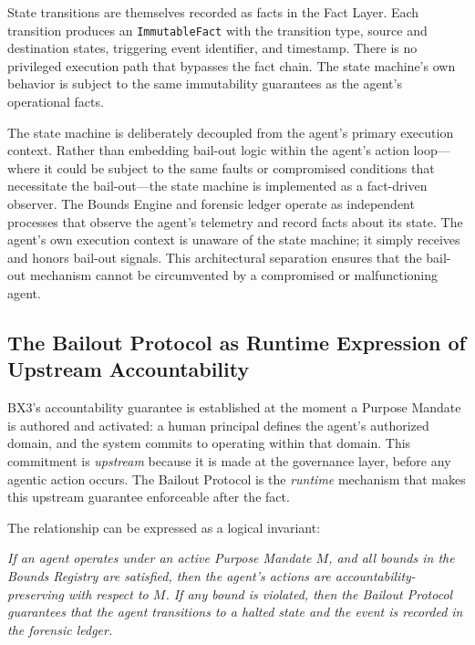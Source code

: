 State transitions are themselves recorded as facts in the Fact Layer. Each transition produces an \texttt{ImmutableFact} with the transition type, source and destination states, triggering event identifier, and timestamp. There is no privileged execution path that bypasses the fact chain. The state machine's own behavior is subject to the same immutability guarantees as the agent's operational facts.

The state machine is deliberately decoupled from the agent's primary execution context. Rather than embedding bail-out logic within the agent's action loop—where it could be subject to the same faults or compromised conditions that necessitate the bail-out—the state machine is implemented as a fact-driven observer. The Bounds Engine and forensic ledger operate as independent processes that observe the agent's telemetry and record facts about its state. The agent's own execution context is unaware of the state machine; it simply receives and honors bail-out signals. This architectural separation ensures that the bail-out mechanism cannot be circumvented by a compromised or malfunctioning agent.

\subsection{The Bailout Protocol as Runtime Expression of Upstream Accountability}
\label{subsection:bailout-upstream-accountability}

BX3's accountability guarantee is established at the moment a Purpose Mandate is authored and activated: a human principal defines the agent's authorized domain, and the system commits to operating within that domain. This commitment is \emph{upstream} because it is made at the governance layer, before any agentic action occurs. The Bailout Protocol is the \emph{runtime} mechanism that makes this upstream guarantee enforceable after the fact.

The relationship can be expressed as a logical invariant:

\begin{center}
\textit{If an agent operates under an active Purpose Mandate $M$, and all bounds in the Bounds Registry are satisfied, then the agent's actions are accountability-preserving with respect to $M$. If any bound is violated, then the Bailout Protocol guarantees that the agent transitions to a halted state and the event is recorded in the forensic ledger.}
\end{center}


